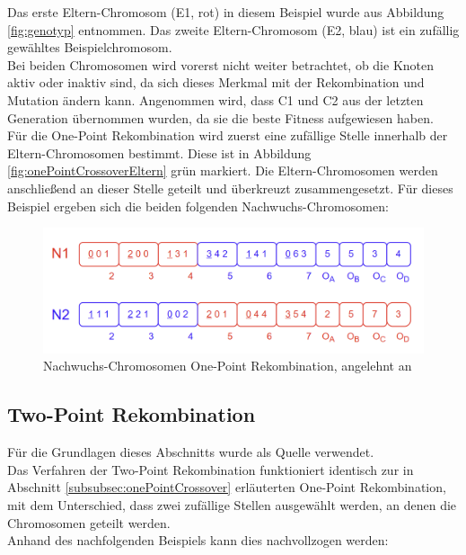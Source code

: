 Das erste Eltern-Chromosom (E1, rot) in diesem Beispiel wurde aus Abbildung \ref{fig:genotyp} entnommen.
Das zweite Eltern-Chromosom (E2, blau) ist ein zufällig gewähltes Beispielchromosom.\\
Bei beiden Chromosomen wird vorerst nicht weiter betrachtet, ob die Knoten aktiv oder inaktiv sind, da sich dieses Merkmal mit der Rekombination und Mutation ändern kann.
Angenommen wird, dass C1 und C2 aus der letzten Generation übernommen wurden, da sie die beste Fitness aufgewiesen haben.\\
Für die One-Point Rekombination wird zuerst eine zufällige Stelle innerhalb der Eltern-Chromosomen bestimmt.
Diese ist in Abbildung \ref{fig:onePointCrossoverEltern} grün markiert.
Die Eltern-Chromosomen werden anschließend an dieser Stelle geteilt und überkreuzt zusammengesetzt.
Für dieses Beispiel ergeben sich die beiden folgenden Nachwuchs-Chromosomen:

\begin{figure}[H]
    \centering
    \includegraphics[scale = 0.5]{Bilder/BeispielOnePointCrossover2.png}
    \caption{Nachwuchs-Chromosomen One-Point Rekombination, angelehnt an \cite{torabi_using_2022}}
    \label{fig:onePointCrossoverNachwuchs}
\end{figure}

\subsection{Two-Point Rekombination}
\label{subsubsec:twoPointCrossover}

Für die Grundlagen dieses Abschnitts wurde \cite{pavai_survey_2017} als Quelle verwendet.\\
Das Verfahren der Two-Point Rekombination funktioniert identisch zur in Abschnitt \ref{subsubsec:onePointCrossover} erläuterten One-Point Rekombination, mit dem Unterschied, dass zwei zufällige Stellen ausgewählt werden, an denen die Chromosomen geteilt werden.\\
Anhand des nachfolgenden Beispiels kann dies nachvollzogen werden:

